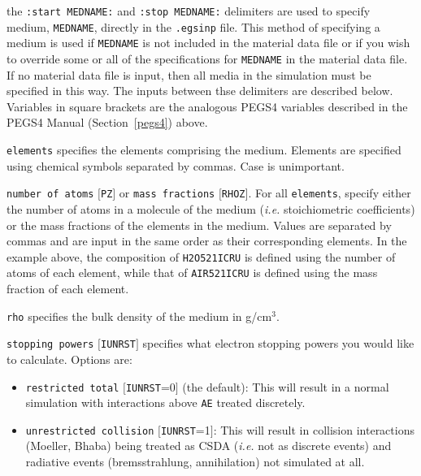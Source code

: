 \begin{description}
\item the {\tt :start MEDNAME:} and {\tt :stop MEDNAME:} delimiters are used to specify medium, {\tt MEDNAME}, directly in the
{\tt .egsinp} file.  This method of specifying a medium is used if {\tt MEDNAME} is not included in the material data file or
if you wish to override some or all of the specifications for {\tt MEDNAME} in the material data file.
If no material data file is input, then all media in the simulation
must be specified in this way.  The inputs between thse delimiters are described below.  Variables
in square brackets are the analogous PEGS4 variables described in the PEGS4 Manual (Section~\ref{pegs4}) above.
\begin{description}
\item {\tt elements} specifies the elements comprising the medium.  Elements are specified using chemical symbols separated by
commas.  Case is unimportant.
\item {\tt number of atoms} $[${\tt PZ}$]$ or {\tt mass fractions} $[${\tt RHOZ}$]$.  For all {\tt elements}, specify either the
number of atoms in a molecule of the medium ({\it i.e.} stoichiometric coefficients) or the mass fractions of the elements in the medium.
Values are separated by commas and are input in the same order as their corresponding elements.  In the example above,
the composition of {\tt H2O521ICRU} is
defined using the number of atoms of each element, while that of {\tt AIR521ICRU} is defined using the mass fraction of each element.
\item {\tt rho} specifies the bulk density of the medium in g/cm$^3$.
\item {\tt stopping powers} $[${\tt IUNRST}$]$ specifies what electron stopping powers you would like to calculate.  Options are:
\begin{itemize}
\item {\tt restricted total} $[${\tt IUNRST}=0$]$ (the default): This will result in a normal simulation with interactions above {\tt AE} treated
discretely.
\item {\tt unrestricted collision} $[${\tt IUNRST}=1$]$: This will result in collision interactions (Moeller, Bhaba) being treated as CSDA ({\it i.e.} not
as discrete events) and radiative events (bremsstrahlung, annihilation) not simulated at all.

\end{itemize}
\end{description}
\end{description}
